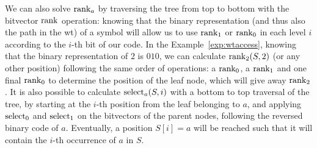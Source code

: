 \documentclass[a4paper,10pt,twoside]{book}
\begin{document}
    We can also solve $\operatorname{rank}_a$ by traversing the tree from top to bottom with the bitvector $\operatorname{rank}$ operation: knowing that the binary representation (and thus also the path in the \gls{wt}) of a symbol will allow us to use $\operatorname{rank}_1$ or $\operatorname{rank}_0$ in each level $i$ according to the $i$-th bit of our code. In the Example~\ref{exp:wtaccess}, knowing that the binary representation of $2$ is $010$, we can calculate $\operatorname{rank}_2(S,2)$ (or any other position) following the same order of operations: a $\operatorname{rank}_0$, a $\operatorname{rank}_1$ and one final $\operatorname{rank}_0$ to determine the position of the leaf node, which will give away $\operatorname{rank}_2$. It is also possible to calculate $\operatorname{select}_a(S,i)$ with a bottom to top traversal of the tree, by starting at the $i$-th position from the leaf belonging to $a$, and applying $\operatorname{select}_0$ and $\operatorname{select}_1$ on the bitvectors of the parent nodes, following the reversed binary code of $a$. Eventually, a position $S[i]=a$ will be reached such that it will contain the $i$-th occurrence of $a$ in $S$.
    
\end{document}
